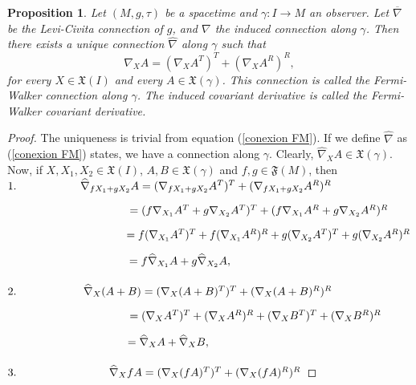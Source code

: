 \documentclass[11pt]{book}
\newtheorem{pro}[defi]{Proposition}
\def\F{\mathfrak F}
\def\x{\mathfrak X}
\begin{document}
\begin{pro}\label{existencia and unicidad conexion FM}
	Let $(M,g,\tau)$ be a spacetime and $\gamma:I\to M$ an observer. Let $\overline{\nabla}$ be the Levi-Civita connection of $g$, and $\nabla$ the induced connection along $\gamma$. Then there exists a unique connection $\widehat{\nabla}$ along $\gamma$ such that
	\begin{equation}\label{conexion FM}
		\widehat{\nabla}_X A=(\nabla_X A^T)^T + (\nabla_X A^R)^R,
	\end{equation}
	for every $X\in \x(I)$ and every $A\in \x(\gamma)$. This connection is called the Fermi-Walker connection along $\gamma$. The induced covariant derivative is called the Fermi-Walker covariant derivative.
\end{pro}
\begin{proof}
	The uniqueness is trivial from equation (\ref{conexion FM}). If we define $\widehat{\nabla}$ as (\ref{conexion FM}) states, we have a connection along $\gamma$. Clearly, $\widehat{\nabla}_X A\in \x(\gamma)$. 
	Now, if $X,X_1,X_2\in \x(I)$, $A,B\in \x(\gamma)$ and $f,g\in \F(M)$, then
	\\
	$1. \hspace{20mm} \widehat{\nabla}_{fX_1+gX_2} A=(\nabla_{fX_1+gX_2} A^T)^T+(\nabla_{fX_1+gX_2} A^R)^R$
	
	\vspace{1mm}
	$\hspace{38mm}= (f\nabla_{X_1} A^T+ g\nabla_{X_2} A^T)^T + (f\nabla_{X_1} A^R + g\nabla_{X_2} A^R)^R$
	
	\vspace{1mm}
	$\hspace{38mm}=f(\nabla_{X_1} A^T)^T+f(\nabla_{X_1} A^R)^R+g(\nabla_{X_2} A^T)^T+g(\nabla_{X_2} A^R)^R$ 
	
	\vspace{1mm}
	$\hspace{38mm}=f\widehat{\nabla}_{X_1} A + g\widehat{\nabla}_{X_2} A,$
	\\ \\
	$2.\hspace{21mm} \widehat{\nabla}_{X}(A+B)=(\nabla_{X} (A+B)^T)^T+(\nabla_{X} (A+B)^R)^R$
	
	\vspace{1mm}
	$\hspace{38mm}=(\nabla_{X} A^T)^T+(\nabla_{X} A^R)^R + (\nabla_{X} B^T)^T+(\nabla_{X} B^R)^R \hspace{5mm}$
	
	\vspace{1mm}
	$\hspace{38mm}=\widehat{\nabla}_{X} A+\widehat{\nabla}_{X} B,\hspace{64mm}$
	\\ \\
	$3. \hspace{29mm} \widehat{\nabla}_{X} fA=(\nabla_{X} (fA)^T)^T+(\nabla_{X} (fA)^R)^R$ 
	

\end{proof}
\end{document}
